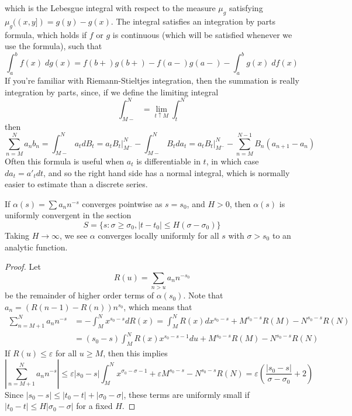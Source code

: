 which is the Lebesgue integral with respect to the measure $\mu_g$ satisfying $\mu_g((x,y]) = g(y) - g(x)$. The integral satisfies an integration by parts formula, which holds if $f$ or $g$ is continuous (which will be satisfied whenever we use the formula), such that
%
\[ \int_a^b f(x)\; dg(x) = f(b+)g(b+) - f(a-)g(a-) - \int_a^b g(x)\; df(x) \]
%
If you're familiar with Riemann-Stieltjes integration, then the summation is really integration by parts, since, if we define the limiting integral
%
\[ \int_{M-}^N = \lim_{t \uparrow M} \int_t^N \]
%
then
%
\[ \sum_{n = M}^N a_nb_n = \int_{M-}^N a_t dB_t = \left. a_tB_t \right|_{M^-}^N - \int_{M-}^N B_t da_t = \left. a_tB_t \right|_{M^-}^N - \sum_{n = M}^{N-1} B_n (a_{n+1} - a_n) \]
%
Often this formula is useful when $a_t$ is differentiable in $t$, in which case $da_t = a'_t dt$, and so the right hand side has a normal integral, which is normally easier to estimate than a discrete series.

\begin{theorem}
    If $\alpha(s) = \sum a_n n^{-s}$ converges pointwise as $s = s_0$, and $H > 0$, then $\alpha(s)$ is uniformly convergent in the section
    \[ S = \{ s: \sigma \geq \sigma_0, |t - t_0| \leq H(\sigma - \sigma_0) \} \]
    Taking $H \to \infty$, we see $\alpha$ converges locally uniformly for all $s$ with $\sigma > s_0$ to an analytic function.
\end{theorem}
\begin{proof}
    Let
    \[ R(u) = \sum_{n > u} a_n n^{-s_0} \]
    be the remainder of higher order terms of $\alpha(s_0)$. Note that $a_n = (R(n-1)-R(n))n^{s_0}$, which means that
    \begin{align*}
        \sum_{n = M+1}^N a_n n^{-s} &= - \int_M^N x^{s_0-s} dR(x) = \int_M^N R(x) dx^{s_0 - s} + M^{s_0 - s} R(M) - N^{s_0 - s} R(N)\\
        &= (s_0 - s) \int_M^N R(x) x^{s_0 - s - 1} du + M^{s_0 - s} R(M) - N^{s_0 - s} R(N)
    \end{align*}
    If $R(u) \leq \varepsilon$ for all $u \geq M$, then this implies
    \[ \left| \sum_{n = M+1}^N a_n n^{-s} \right| \leq \varepsilon |s_0 - s| \int_M^N x^{\sigma_0 - \sigma - 1} + \varepsilon M^{s_0 - s} - N^{s_0 - s} R(N) = \varepsilon \left( \frac{|s_0 - s|}{\sigma - \sigma_0} + 2 \right) \]
    Since $|s_0 - s| \leq |t_0 - t| + |\sigma_0 - \sigma|$, these terms are uniformly small if $|t_0 - t| \leq H |\sigma_0 - \sigma|$ for a fixed $H$.
\end{proof}

